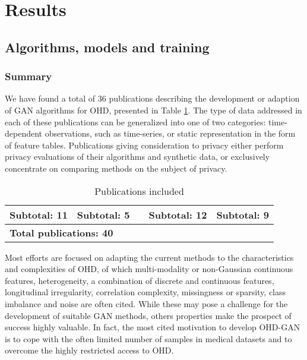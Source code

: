 \section{Results}
\subsection{Algorithms, models and training}
\subsubsection{Summary}
We have found a total of 36 publications describing the development or adaption of GAN algorithms for OHD, presented in Table \ref{tab:citeinc}. The type of data addressed in each of these publications can be generalized into one of two categories: time-dependent observations, such as time-series, or static representation in the form of feature tables. Publications giving consideration to privacy either perform privacy evaluations of their algorithms and synthetic data, or exclusively concentrate on comparing methods on the subject of privacy.

\begin{table}
  \centering
    \caption{Publications included}\label{tab:citeinc}
  
    \begin{tabular}{@{}lllll@{}} \toprule
    
    \multicolumn{1}{l}{Subtotal: 11} & \multicolumn{1}{l}{Subtotal: 5} & {} & \multicolumn{1}{l}{Subtotal: 12} & \multicolumn{1}{l}{Subtotal: 9}\\ \midrule
    
    \multicolumn{5}{l}{\textbf{Total publications: 40}}\\
    \bottomrule
    \end{tabular}
\end{table}

Most efforts are focused on adapting the current methods to the characteristics and complexities of OHD, of which multi-modality or non-Gaussian continuous features, heterogeneity, a combination of discrete and continuous features, longitudinal irregularity, correlation complexity, missingness or sparsity, class imbalance and noise are often cited. While these may pose a challenge for the development of suitable GAN methods, others properties make the prospect of success highly valuable. In fact, the most cited motivation to develop OHD-GAN is to cope with the often limited number of samples in medical datasets and to overcome the highly restricted access to OHD.\par

